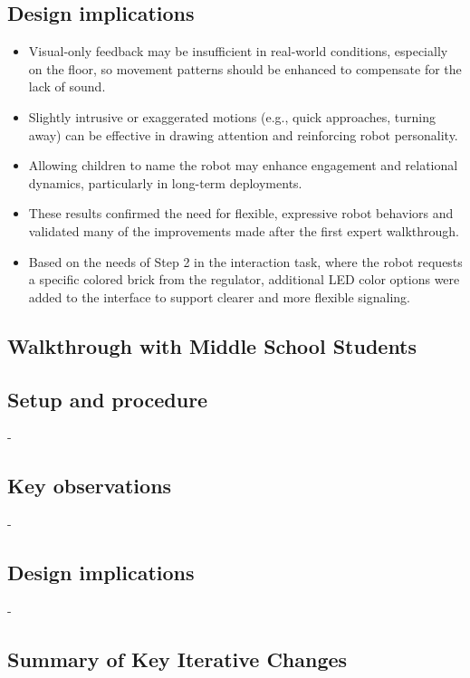 \documentclass[a4paper]{usiinfbachelorproject}
\begin{document}
\subsection*{\textbf{Design implications}}
\begin{itemize}
    \item Visual-only feedback may be insufficient in real-world conditions, especially on the floor, so movement patterns should be enhanced to compensate for the lack of sound.
    \item Slightly intrusive or exaggerated motions (e.g., quick approaches, turning away) can be effective in drawing attention and reinforcing robot personality.
    \item Allowing children to name the robot may enhance engagement and relational dynamics, particularly in long-term deployments.
    \item These results confirmed the need for flexible, expressive robot behaviors and validated many of the improvements made after the first expert walkthrough.
    \item Based on the needs of Step 2 in the interaction task, where the robot requests a specific colored brick from the regulator, additional LED color options were added to the interface to support clearer and more flexible signaling.
\end{itemize}

\subsection{\textbf{Walkthrough with Middle School Students}}
\subsection*{\textbf{Setup and procedure}}
-
\subsection*{\textbf{Key observations}}
-
\subsection*{\textbf{Design implications}}
-

\subsection{\textbf{Summary of Key Iterative Changes}}


\end{document}
